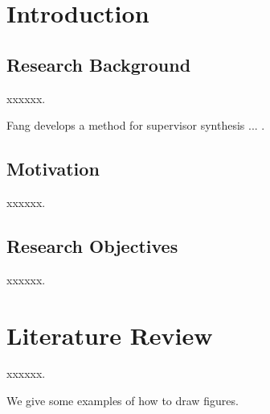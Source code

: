 \documentclass{article}
\begin{document}
\setcounter{page}{1}

\section{Introduction}
\subsection{Research Background}

xxxxxx.

Fang develops a method for supervisor synthesis ... \cite{Fang2019}.







\subsection{Motivation}

xxxxxx.



\subsection{Research Objectives}

xxxxxx.




\section{Literature Review}

xxxxxx.

We give some examples of how to draw figures.
\end{document}
